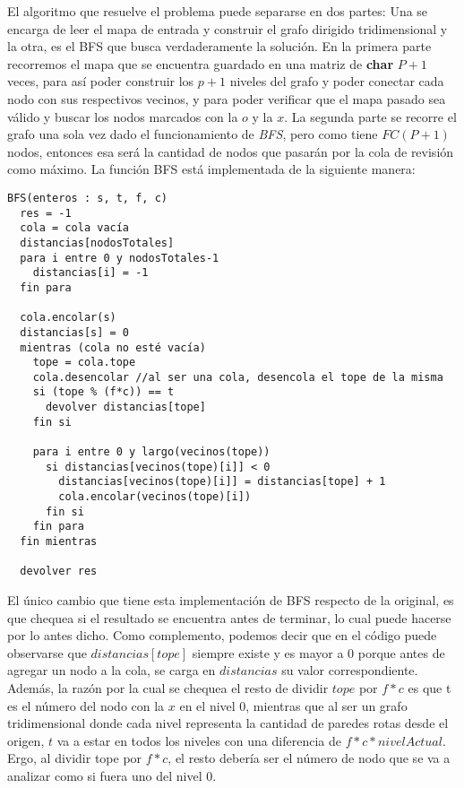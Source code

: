 \begin{itemize}
            El algoritmo que resuelve el problema puede separarse en dos partes: Una se encarga de leer el mapa de entrada y construir el grafo dirigido tridimensional y la otra, es el BFS que busca verdaderamente la solución.
            En la primera parte recorremos el mapa que se encuentra guardado en una matriz de \textbf{char} $P+1$ veces, para así poder construir los $p+1$ niveles del grafo y poder conectar cada nodo con sus respectivos vecinos, y para poder verificar que el mapa pasado sea válido y buscar los nodos marcados con la $o$ y la $x$.
            La segunda parte se recorre el grafo una sola vez dado el funcionamiento de \textit{BFS}, pero como tiene $FC(P+1)$ nodos, entonces esa será la cantidad de nodos que pasarán por la cola de revisión como máximo. La función BFS está implementada de la siguiente manera:


            \begin{codesnippet}
            \begin{verbatim}
BFS(enteros : s, t, f, c)
  res = -1
  cola = cola vacía
  distancias[nodosTotales]
  para i entre 0 y nodosTotales-1
    distancias[i] = -1
  fin para

  cola.encolar(s)
  distancias[s] = 0
  mientras (cola no esté vacía)
    tope = cola.tope
    cola.desencolar //al ser una cola, desencola el tope de la misma
    si (tope % (f*c)) == t
      devolver distancias[tope]
    fin si

    para i entre 0 y largo(vecinos(tope))
      si distancias[vecinos(tope)[i]] < 0
        distancias[vecinos(tope)[i]] = distancias[tope] + 1
        cola.encolar(vecinos(tope)[i])
      fin si
    fin para
  fin mientras

  devolver res
            \end{verbatim}
            \end{codesnippet}

            El único cambio que tiene esta implementación de BFS respecto de la original, es que chequea si el resultado se encuentra antes de terminar, lo cual puede hacerse por lo antes dicho. Como complemento, podemos decir que en el código puede observarse que $distancias[tope]$ siempre existe y es mayor a $0$ porque antes de agregar un nodo a la cola, se carga en $distancias$ su valor correspondiente. Además, la razón por la cual se chequea el resto de dividir $tope$ por $f*c$ es que t es el número del nodo con la $x$ en el nivel 0, mientras que al ser un grafo tridimensional donde cada nivel representa la cantidad de paredes rotas desde el origen, $t$ va a estar en todos los niveles con una diferencia de $f*c*nivelActual$. Ergo, al dividir tope por $f*c$, el resto debería ser el número de nodo que se va a analizar como si fuera uno del nivel 0.




\end{itemize}
